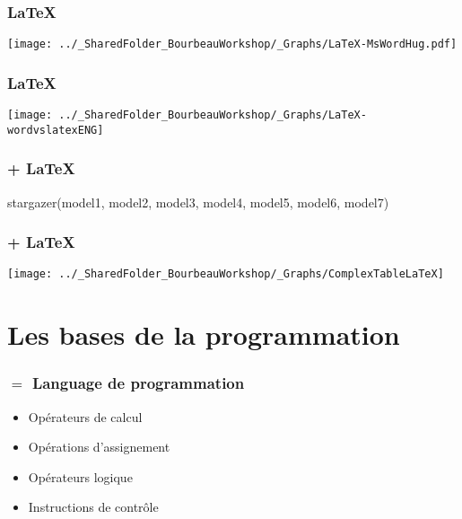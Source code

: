 \documentclass{beamer}
\begin{document}
    \begin{frame}
        \frametitle{\LaTeX} \vspace{1cm}   
        \begin{center}
           \texttt{[image: ../\_SharedFolder\_BourbeauWorkshop/\_Graphs/LaTeX-MsWordHug.pdf]}
        \end{center}  
    \end{frame}

    \begin{frame}
        \frametitle{\LaTeX} \vspace{1cm}
        \begin{center}
           \texttt{[image: ../\_SharedFolder\_BourbeauWorkshop/\_Graphs/LaTeX-wordvslatexENG]}
        \end{center} 
    \end{frame}
 
    \begin{frame}[fragile=singleslide]
        \frametitle{\R + \LaTeX} \vspace{0.5cm} 
        \begin{code}
stargazer(model1, model2, model3, model4, model5, model6, model7)
        \end{code}
    \end{frame}   

    \begin{frame}
        \frametitle{\R + \LaTeX} \vspace{1cm}   
        \begin{center}
           \texttt{[image: ../\_SharedFolder\_BourbeauWorkshop/\_Graphs/ComplexTableLaTeX]}
        \end{center}  
    \end{frame}















\section{\R {} Les bases de la programmation}

    \begin{frame}
        \frametitle{\R $=$ Language de programmation}
        \begin{itemize}
            \item Opérateurs de calcul
            \item Opérations d'assignement
            \item Opérateurs logique
            \item Instructions de contrôle
        \end{itemize}
    \end{frame}
\end{document}

